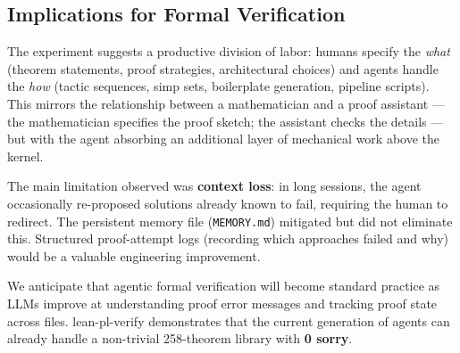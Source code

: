 \subsection{Implications for Formal Verification}

The experiment suggests a productive division of labor:
humans specify the \emph{what} (theorem statements, proof strategies,
architectural choices) and agents handle the \emph{how} (tactic sequences,
simp sets, boilerplate generation, pipeline scripts).
This mirrors the relationship between a mathematician and a proof assistant
— the mathematician specifies the proof sketch; the assistant checks
the details — but with the agent absorbing an additional layer of mechanical
work above the kernel.

The main limitation observed was \textbf{context loss}: in long sessions,
the agent occasionally re-proposed solutions already known to fail,
requiring the human to redirect.
The persistent memory file (\texttt{MEMORY.md}) mitigated but did not
eliminate this.  Structured proof-attempt logs (recording which approaches
failed and why) would be a valuable engineering improvement.

We anticipate that agentic formal verification will become standard practice
as LLMs improve at understanding proof error messages and tracking proof
state across files.  lean-pl-verify demonstrates that the current generation
of agents can already handle a non-trivial 258-theorem library with
\textbf{0 sorry}.
